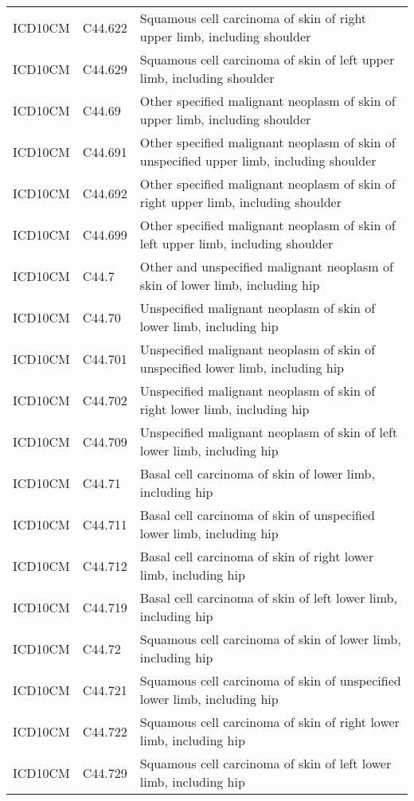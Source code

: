 \begin{longtable}{p{}p{}p{}}
  ICD10CM & C44.622 & Squamous cell carcinoma of skin of right upper limb, including shoulder \\ 
  ICD10CM & C44.629 & Squamous cell carcinoma of skin of left upper limb, including shoulder \\ 
  ICD10CM & C44.69 & Other specified malignant neoplasm of skin of upper limb, including shoulder \\ 
  ICD10CM & C44.691 & Other specified malignant neoplasm of skin of unspecified upper limb, including shoulder \\ 
  ICD10CM & C44.692 & Other specified malignant neoplasm of skin of right upper limb, including shoulder \\ 
  ICD10CM & C44.699 & Other specified malignant neoplasm of skin of left upper limb, including shoulder \\ 
  ICD10CM & C44.7 & Other and unspecified malignant neoplasm of skin of lower limb, including hip \\ 
  ICD10CM & C44.70 & Unspecified malignant neoplasm of skin of lower limb, including hip \\ 
  ICD10CM & C44.701 & Unspecified malignant neoplasm of skin of unspecified lower limb, including hip \\ 
  ICD10CM & C44.702 & Unspecified malignant neoplasm of skin of right lower limb, including hip \\ 
  ICD10CM & C44.709 & Unspecified malignant neoplasm of skin of left lower limb, including hip \\ 
  ICD10CM & C44.71 & Basal cell carcinoma of skin of lower limb, including hip \\ 
  ICD10CM & C44.711 & Basal cell carcinoma of skin of unspecified lower limb, including hip \\ 
  ICD10CM & C44.712 & Basal cell carcinoma of skin of right lower limb, including hip \\ 
  ICD10CM & C44.719 & Basal cell carcinoma of skin of left lower limb, including hip \\ 
  ICD10CM & C44.72 & Squamous cell carcinoma of skin of lower limb, including hip \\ 
  ICD10CM & C44.721 & Squamous cell carcinoma of skin of unspecified lower limb, including hip \\ 
  ICD10CM & C44.722 & Squamous cell carcinoma of skin of right lower limb, including hip \\ 
  ICD10CM & C44.729 & Squamous cell carcinoma of skin of left lower limb, including hip \\ 

\end{longtable}
